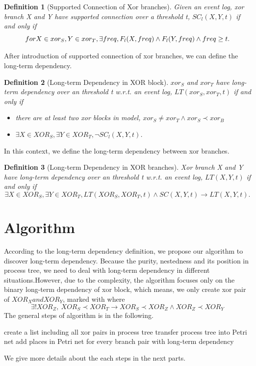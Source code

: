 \documentclass[]{article}
\newtheorem{mydef}{Definition}[section]
\begin{document}
\begin{mydef}[Supported Connection of Xor branches\footnotemark]
Given an event log, xor branch X and Y have supported connection over a threshold t, $SC_{l}(X,Y,t)$ if and only if \[ for \space X \in xor_S, Y \in xor_T, \exists freq, F_{l}(X,freq) \land F_{l}(Y,freq) \land freq \geq t. \]
\end{mydef}
After introduction of supported connection of xor branches, we can define the long-term dependency. 
\begin{mydef}[Long-term Dependency in XOR block]
	$xor_S$ and $xor_T$ have long-term dependency over an threshold t w.r.t. an event log, $LT(xor_S, xor_T,t) $ if and only if 
	\begin{itemize}
		\item there are at least two xor blocks in model, $xor_S \neq xor_T \land xor_S \prec xor_B$
		\item $\exists X \in XOR_S, \exists Y \in XOR_T, \lnot SC_{l}(X,Y,t)$. 
	\end{itemize}
\end{mydef}
In this context, we define the long-term dependency between xor branches.
\begin{mydef}[Long-term Dependency in XOR branches]
	Xor branch X and Y have long-term dependency over an threshold t w.r.t. an event log, $LT(X,Y,t) $ if and only if  
	\[\exists X \in XOR_S, \exists Y \in XOR_T, LT(XOR_S, XOR_T, t) \land SC(X,Y,t) \rightarrow LT(X,Y,t).\]	
\end{mydef}

\section{Algorithm}
According to the long-term dependency definition, we propose our algorithm to discover long-term dependency. Because the purity, nestedness and its position in process tree, we need to deal with long-term dependency in different situations.However, due to the complexity, the algorithm focuses only on the binary long-term dependency of xor block, which means, we only create xor pair of $XOR_X and XOR_Y$, marked with where 
\[ \exists ! XOR_Z, \: XOR_S \prec XOR_T \rightarrow XOR_S \prec XOR_Z \land XOR_Z \prec XOR_Y \]
The general steps of algorithm is in the following. 

\begin{algorithm}[H]
	\SetAlgoLined
	create a list including all xor pairs in process tree\;
	transfer process tree into Petri net\;
	add places in Petri net for every branch pair with long-term dependency\;
	\caption{General steps to add long-term dependency}
\end{algorithm}
We give more details about the each steps in the next parts.
\end{document}
